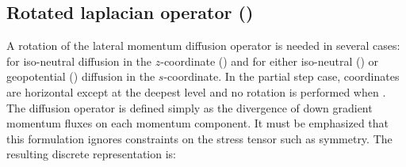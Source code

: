 \documentclass[../main/NEMO_manual]{subfiles}
\begin{document}
\subsection[Rotated laplacian (\forcode{ln_dynldf_iso})]{Rotated laplacian operator (\protect{})}
\label{subsec:DYN_ldf_iso}

A rotation of the lateral momentum diffusion operator is needed in several cases:
for iso-neutral diffusion in the $z$-coordinate () and
for either iso-neutral () or
geopotential () diffusion in the $s$-coordinate.
In the partial step case, coordinates are horizontal except at the deepest level and
no rotation is performed when .
The diffusion operator is defined simply as the divergence of down gradient momentum fluxes on
each momentum component.
It must be emphasized that this formulation ignores constraints on the stress tensor such as symmetry.
The resulting discrete representation is:
\end{document}
